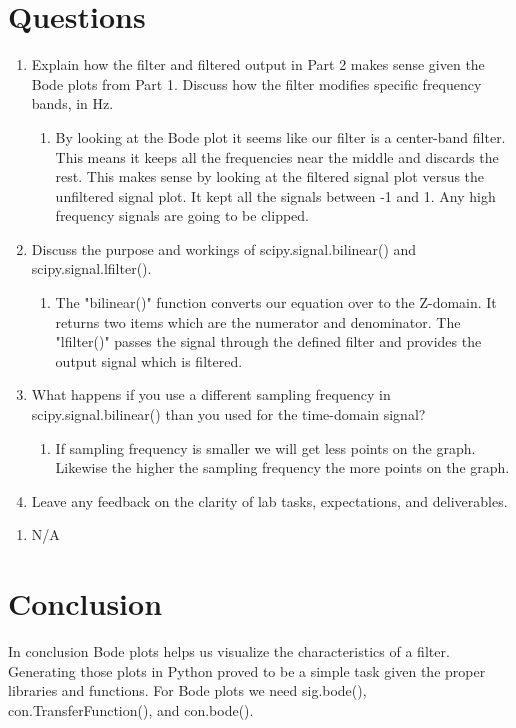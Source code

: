 \documentclass[12pt]{article}
\begin{document}
\section{Questions}
\begin{enumerate}
    \item Explain how the filter and filtered output in Part 2 makes sense given the Bode plots from
Part 1. Discuss how the filter modifies specific frequency bands, in Hz.
    \begin{enumerate}
        \item By looking at the Bode plot it seems like our filter is a center-band filter. This means it keeps all the frequencies near the middle and discards the rest. This makes sense by looking at the filtered signal plot versus the unfiltered signal plot. It kept all the signals between -1 and 1. Any high frequency signals are going to be clipped.
    \end{enumerate}
    

    \item Discuss the purpose and workings of
scipy.signal.bilinear() and scipy.signal.lfilter().
    \begin{enumerate}
        \item The "bilinear()" function converts our equation over to the Z-domain. It returns two items which are the numerator and denominator. The "lfilter()" passes the signal through the defined filter and provides the output signal which is filtered.
    \end{enumerate}
    \item What happens if you use a different sampling frequency in scipy.signal.bilinear() than
you used for the time-domain signal?
    \begin{enumerate}
        \item If sampling frequency is smaller we will get less points on the graph. Likewise the higher the sampling frequency the more points on the graph.
    \end{enumerate}
    \item Leave any feedback on the clarity of lab tasks, expectations, and deliverables.
\end{enumerate}
    \begin{enumerate}
        \item N/A 
    \end{enumerate}


\section{Conclusion}
In conclusion Bode plots helps us visualize the characteristics of a filter. Generating those plots in Python proved to be a simple task given the proper libraries and functions. For Bode plots we need sig.bode(), con.TransferFunction(), and con.bode().
\end{document}
